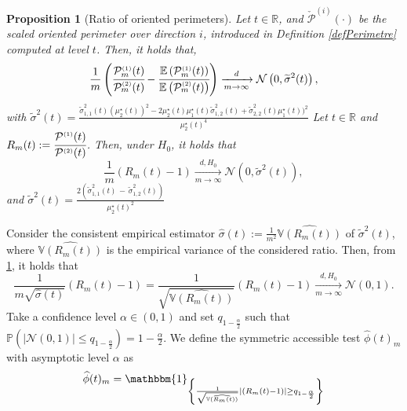 \documentclass[12pt]{article}
\renewcommand{\tilde}{\widetilde}
\renewcommand{\hat}{\widehat}
\theoremstyle{Theorem}
\newtheorem{Proposition}[Theorem]{Proposition}
\begin{document}
\begin{Proposition}[Ratio of oriented perimeters]\label{deltamethodgeneralprop} 
Let  $t \in \mathbb{R}$, and $\check{\mathcal{P}}^{\scriptscriptstyle  (i) }(\cdot)$ be the scaled oriented perimeter over direction $i$, introduced in Definition \ref{defPerimetre} computed at level $t$. Then, it holds that,
\begin{equation*}
\frac{1}{m}\left(\cfrac{\mathcal{P}^{\scriptscriptstyle  (1) }_{m}(t)}{\mathcal{P}^{\scriptscriptstyle  (2)}_{m}(t)} - \cfrac{\mathbb{E}\left(\mathcal{P}^{\scriptscriptstyle  (1) }_{m}(t)\right)}{\mathbb{E}\left(\mathcal{P}^{\scriptscriptstyle  (2)}_{m}(t)\right)} \right)  \xrightarrow[m \to \infty]{d} \mathcal{N}\left(0,  \tilde{\sigma}^{2}(t) \right),
\end{equation*}
with $\tilde{\sigma}^{2}(t) = \frac{\tilde{\sigma}_{\scriptscriptstyle 1,1}^{2}(t)(\mu^{\star}_{2}(t))^{2} - 2\mu^{\star}_{2}(t)\mu^{\star}_{1}(t)\tilde{\sigma}_{\scriptscriptstyle 1,2}^{2}(t) +\tilde{\sigma}_{\scriptscriptstyle 2,2}^{2}(t)\mu^{\star}_{1}(t))^{2}}{\mu^{\star}_{2}(t)^4}$
Let $t \in \mathbb{R}$  and  $R_{m}(t) := \cfrac{\mathcal{P}^{\scriptscriptstyle  (1) }(t)}{\mathcal{P}^{\scriptscriptstyle  (2) }(t)}$. Then, under $H_{0}$, it holds that
\begin{equation}\label{ratiounderH0}
\frac{1}{m}\left(R_{m}(t) - 1 \right)  \xrightarrow[m \to \infty]{d, H_0} \mathcal{N}\left(0,  \tilde{\sigma}^{2}(t)  \right),
\end{equation}
and $\tilde{\sigma}^{2}(t) = \frac{2\left(\tilde{\sigma}_{\scriptscriptstyle 1,1}^{2}(t) \, - \, \tilde{\sigma}_{\scriptscriptstyle 1,2}^{2}(t)\right)}{\mu^{\star}_{2}(t)^2}$
\end{Proposition}
Consider the consistent empirical estimator $\hat{\sigma}(t):= \frac{1}{m^2}\hat{\mathbb{V}\left(R_{m}(t)\right)}$ of $\tilde{\sigma}^{2}(t)$, where $\hat{\mathbb{V}\left(R_{m}(t)\right)}$ is the empirical variance of the considered ratio. Then, from \ref{deltamethodgeneralprop}, it holds that 
$$ \frac{1}{m\sqrt{\hat{\sigma}(t)}}\left(R_{m}(t) - 1 \right) = \frac{1}{\sqrt{\hat{\mathbb{V}\left(R_{m}(t)\right)}}}\left(R_{m}(t) - 1 \right)   \xrightarrow[m \to \infty]{d, H_{0}} \mathcal{N}\left(0, 1 \right).$$
Take a confidence level $\alpha \in (0,1)$ and set $q_{1-\frac{\alpha}{2}}$ such that $\mathbb{P}\left(|\mathcal{N}\left(0,1\right)| \leq  q_{1-\frac{\alpha}{2}} \right) = 1 - \frac{\alpha}{2}$. We define the symmetric accessible test $\hat{\phi}(t)_{m}$ with asymptotic level $\alpha$ as 
\begin{equation}
\label{phihat}
\hat{\phi}(t)_{m}= \mathbbm{1}_{\left\{ \frac{1}{\sqrt{\hat{\mathbb{V}\left(R_{m}(t)\right)}}}\left|\left(R_{m}(t) - 1 \right)\right| \geq q_{1- \frac{\alpha}{2}} \right\}}
\end{equation}
\end{document}
